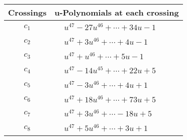 \documentclass[1p]{elsarticle_modified}
\theoremstyle{definition}
\begin{document}
\begin{tabular}{m{50pt}|m{274pt}}
Crossings & \hspace{64pt}u-Polynomials at each crossing \\
\hline $$\begin{aligned}c_{1}\end{aligned}$$&$\begin{aligned}
&u^{47}-27 u^{46}+\cdots+34 u-1
\end{aligned}$\\
\hline $$\begin{aligned}c_{2}\end{aligned}$$&$\begin{aligned}
&u^{47}+3 u^{46}+\cdots+4 u-1
\end{aligned}$\\
\hline $$\begin{aligned}c_{3}\end{aligned}$$&$\begin{aligned}
&u^{47}+u^{46}+\cdots+5 u-1
\end{aligned}$\\
\hline $$\begin{aligned}c_{4}\end{aligned}$$&$\begin{aligned}
&u^{47}-14 u^{45}+\cdots+22 u+5
\end{aligned}$\\
\hline $$\begin{aligned}c_{5}\end{aligned}$$&$\begin{aligned}
&u^{47}-3 u^{46}+\cdots+4 u+1
\end{aligned}$\\
\hline $$\begin{aligned}c_{6}\end{aligned}$$&$\begin{aligned}
&u^{47}+18 u^{46}+\cdots+73 u+5
\end{aligned}$\\
\hline $$\begin{aligned}c_{7}\end{aligned}$$&$\begin{aligned}
&u^{47}+3 u^{46}+\cdots-18 u+5
\end{aligned}$\\
\hline $$\begin{aligned}c_{8}\end{aligned}$$&$\begin{aligned}
&u^{47}+5 u^{46}+\cdots+3 u+1
\end{aligned}$\\

\end{tabular}
\end{document}
